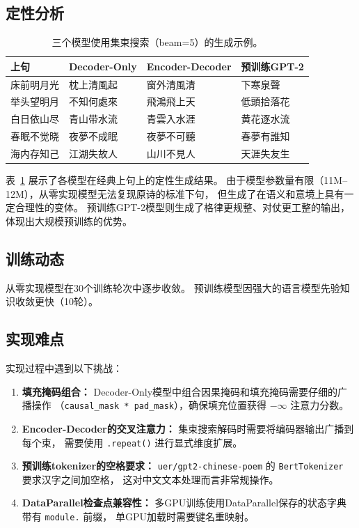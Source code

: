 \documentclass[11pt,a4paper]{article}
\begin{document}
\subsection{定性分析}

\begin{table}[H]
\centering
\small
\renewcommand{\arraystretch}{1.2}
\caption{三个模型使用集束搜索（beam=5）的生成示例。}
\label{tab:examples}
\begin{tabular}{p{2.5cm}p{3.2cm}p{3.2cm}p{3.2cm}}
\toprule
\textbf{上句} & \textbf{Decoder-Only} & \textbf{Encoder-Decoder} & \textbf{预训练GPT-2} \\
\midrule
床前明月光      & 枕上清風起    & 窗外清風清    & 下寒泉聲 \\
举头望明月      & 不知何處來    & 飛鴻飛上天    & 低頭拾落花 \\
白日依山尽      & 青山带水流    & 青雲入水涯    & 黄花逐水流 \\
春眠不觉晓      & 夜夢不成眠    & 夜夢不可聽    & 春夢有誰知 \\
海内存知己      & 江湖失故人    & 山川不見人    & 天涯失友生 \\
\bottomrule
\end{tabular}
\end{table}

表~\ref{tab:examples} 展示了各模型在经典上句上的定性生成结果。
由于模型参数量有限（11M--12M），从零实现模型无法复现原诗的标准下句，
但生成了在语义和意境上具有一定合理性的变体。
预训练GPT-2模型则生成了格律更规整、对仗更工整的输出，体现出大规模预训练的优势。

\subsection{训练动态}

从零实现模型在30个训练轮次中逐步收敛。
预训练模型因强大的语言模型先验知识收敛更快（10轮）。

\subsection{实现难点}

实现过程中遇到以下挑战：
\begin{enumerate}[nosep]
    \item \textbf{填充掩码组合：}
          Decoder-Only模型中组合因果掩码和填充掩码需要仔细的广播操作
          （\texttt{causal\_mask * pad\_mask}），确保填充位置获得 \(-\infty\) 注意力分数。
    \item \textbf{Encoder-Decoder的交叉注意力：}
          集束搜索解码时需要将编码器输出广播到每个束，
          需要使用 \texttt{.repeat()} 进行显式维度扩展。
    \item \textbf{预训练tokenizer的空格要求：}
          \texttt{uer/gpt2-chinese-poem} 的 \texttt{BertTokenizer} 要求汉字之间加空格，
          这对中文文本处理而言非常规操作。
    \item \textbf{DataParallel检查点兼容性：}
          多GPU训练使用DataParallel保存的状态字典带有 \texttt{module.} 前缀，
          单GPU加载时需要键名重映射。
\end{enumerate}
\end{document}
